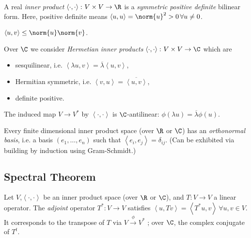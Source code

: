 \documentclass{notes}
\begin{document}
\begin{defn}
    A real \emph{inner product} $\left\langle \cdot ,\cdot  \right\rangle\colon V\times V \to  \R $ is a \emph{symmetric} \emph{positive definite} bilinear form. Here, positive definite means $\left\langle u,u \right\rangle=\norm{u}^2 >0\,\forall u\neq 0$.
\end{defn}

\begin{theorem}
    $\left\langle u,v \right\rangle\le \norm{u} \norm{v} $.
\end{theorem}

\begin{defn}
    Over $\C $ we consider \emph{Hermetian inner products} $\left\langle \cdot ,\cdot  \right\rangle\colon V\times V\to \C $ which are
    \begin{itemize}
        \item sesquilinear, i.e. $\left\langle \lambda u,v \right\rangle=\overline{\lambda }\left\langle u,v \right\rangle$,
        \item Hermitian symmetric, i.e. $\left\langle v,u \right\rangle=\overline{\left\langle u,v \right\rangle}$,
        \item definite positive.
    \end{itemize}
    
    The induced map $V\to V^{*}$ by $\left\langle \cdot ,\cdot  \right\rangle$ is $\C $-antilinear: $\phi (\lambda u)=\overline{\lambda }\phi(u)$.
\end{defn}

\begin{theorem}
    Every finite dimensional inner product space (over $\R $ or $\C $) has an \emph{orthonormal basis}, i.e. a basis $\left( {e}_{1},\ldots,{e}_{n}  \right) $ such that $\left\langle e_i,e_j \right\rangle=\delta_{ij}$. (Can be exhibited via building by induction using Gram-Schmidt.)
\end{theorem}

\subsection{Spectral Theorem}

\begin{defn}
    Let $V$,$\left\langle \cdot ,\cdot  \right\rangle$ be an inner product space (over  $\R $ or $\C $), and $T\colon V \to V $ a linear operator. The \emph{adjoint} operator $T^{*}\colon V\to V$ satisfies $\left\langle u,Tv \right\rangle=\left\langle T^{*}u,v \right\rangle\, \forall u,v\in V$. It corresponds to the transpose of $T$ via $V\xrightarrow{\phi }V^{*}$ ; over $\C $, the complex conjugate of $T^t$.  
\end{defn}
\end{document}

